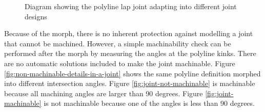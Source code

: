 \begin{figure}[!h]
\begin{subfigure}[b]{0.49\textwidth}
    \end{subfigure}
    \caption{Diagram showing the polyline lap joint adapting into different joint designs}
    \label{fig:polyine-lap-joint-adaptability-2}
\end{figure}

Because of the morph, there is no inherent protection against modelling a joint that cannot be machined. However, a simple machinability check can be performed after the morph by measuring the angles at the polyline kinks. There are no automatic solutions included to make the joint machinable. Figure \ref{fig:non-machinable-details-in-a-joint} shows the same polyline definition morphed into different intersection angles. Figure \ref{fig:joint-not-machinable} is machinable because all machining angles are larger than 90 degrees. Figure \ref{fig:joint-machinable} is not machinable because one of the angles is less than 90 degrees. 

